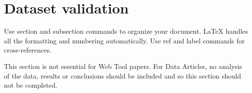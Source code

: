 \section*{Dataset validation}
Use section and subsection commands to organize your document. \LaTeX{} handles all the formatting and numbering automatically. Use ref and label commands for cross-references.

This section is not essential for Web Tool papers. 
For Data Articles, no analysis of the data, results or conclusions should be included and so this section should not be completed. 